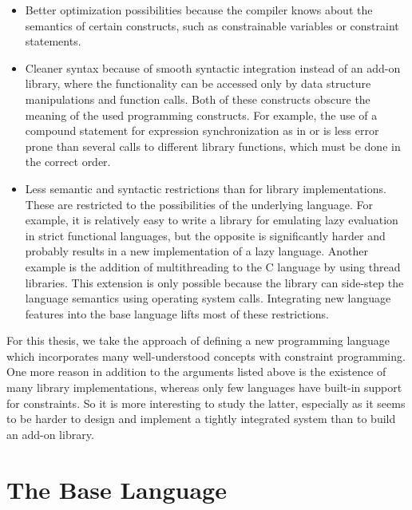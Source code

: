 \begin{itemize}
\item Better optimization possibilities because the compiler knows
  about the semantics of certain constructs, such as constrainable
  variables or constraint statements.
  
\item Cleaner syntax because of smooth syntactic integration instead
  of an add-on library, where the functionality can be accessed only
  by data structure manipulations and function calls.  Both of these
  constructs obscure the meaning of the used programming constructs.
  For example, the use of a compound statement for expression
  synchronization as in \java{} or \ada{} is less error prone than
  several calls to different library functions, which must be done in
  the correct order.
  
\item Less semantic and syntactic restrictions than for library
  implementations.  These are restricted to the possibilities of the
  underlying language.  For example, it is relatively easy to write a
  library for emulating lazy evaluation in strict functional
  languages, but the opposite is significantly harder and probably
  results in a new implementation of a lazy language.  Another example
  is the addition of multithreading to the C language by using thread
  libraries. This extension is only possible because the library can
  side-step the language semantics using operating system calls.
  Integrating new language features into the base language lifts most
  of these restrictions.
\end{itemize}

\noindent
For this thesis, we take the approach of defining a new programming
language which incorporates many well-understood concepts with
constraint programming.  One more reason in addition to the arguments
listed above is the existence of many library implementations, whereas
only few languages have built-in support for constraints.  So it is
more interesting to study the latter, especially as it seems to be
harder to design and implement a tightly integrated system than to
build an add-on library.

\section{The Base Language}
\label{sec:base-language}

